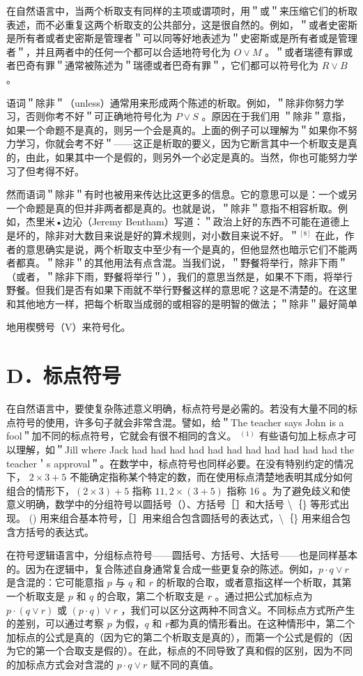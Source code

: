 在自然语言中，当两个析取支有同样的主项或谓项时，用＂或＂来压缩它们的析取表述，而不必重复这两个析取支的公共部分，这是很自然的。例如，＂或者史密斯是所有者或者史密斯是管理者＂可以同等好地表述为＂史密斯或是所有者或是管理者＂，并且两者中的任何一个都可以合适地符号化为 $O \vee M$ 。＂或者瑞德有罪或者巴奇有罪＂通常被陈述为＂瑞德或者巴奇有罪＂，它们都可以符号化为 $R \vee B$ 。

语词＂除非＂（unless）通常用来形成两个陈述的析取。例如，＂除非你努力学习，否则你考不好＂可正确地符号化为 $P \vee S$ 。原因在于我们用 ＂除非＂意指，如果一个命题不是真的，则另一个会是真的。上面的例子可以理解为＂如果你不努力学习，你就会考不好＂——这正是析取的要义，因为它断言其中一个析取支是真的，由此，如果其中一个是假的，则另外一个必定是真的。当然，你也可能努力学习了但考得不好。

然而语词＂除非＂有时也被用来传达比这更多的信息。它的意思可以是：一个或另一个命题是真的但并非两者都是真的。也就是说，＂除非＂意指不相容析取。例如，杰里米•边沁（Jeremy Bentham）写道：＂政治上好的东西不可能在道德上是坏的，除非对大数目来说是好的算术规则，对小数目来说不好。＂${ }^{[8]}$ 在此，作者的意思确实是说，两个析取支中至少有一个是真的，但他显然也暗示它们不能两者都真。＂除非＂的其他用法有点含混。当我们说，＂野餐将举行，除非下雨＂（或者，＂除非下雨，野餐将举行＂），我们的意思当然是，如果不下雨，将举行野餐。但我们是否有如果下雨就不举行野餐这样的意思呢？这是不清楚的。在这里和其他地方一样，把每个析取当成弱的或相容的是明智的做法；＂除非＂最好简单

地用楔劈号（V）来符号化。

\section*{D．标点符号}
在自然语言中，要使复杂陈述意义明确，标点符号是必需的。若没有大量不同的标点符号的使用，许多句子就会非常含混。譬如，给＂The teacher says John is a fool＂加不同的标点符号，它就会有很不相同的含义。 ${ }^{(1)}$ 有些语句加上标点才可以理解，如＂Jill where Jack had had had had had had had had had had had the teacher＇s approval＂。在数学中，标点符号也同样必要。在没有特别约定的情况下， $2 \times 3+5$ 不能确定指称某个特定的数，而在使用标点清楚地表明其成分如何组合的情形下，$(2 \times 3)+5$ 指称 $11,2 \times(3+5)$ 指称 16 。为了避免歧义和使意义明确，数学中的分组符号以圆括号（）、方括号［］和大括号 \textbackslash ｛\} 等形式出现。 () 用来组合基本符号，［］用来组合包含圆括号的表达式，\textbackslash ｛\} 用来组合包含方括号的表达式。

在符号逻辑语言中，分组标点符号——圆括号、方括号、大括号——也是同样基本的。因为在逻辑中，复合陈述自身通常复合成一些更复杂的陈述。例如，$p \cdot q \vee r$ 是含混的：它可能意指 $p$ 与 $q$ 和 $r$ 的析取的合取，或者意指这样一个析取，其第一个析取支是 $p$ 和 $q$ 的合取，第二个析取支是 $r$ 。通过把公式加标点为 $p \cdot(q \vee r)$ 或 $(p \cdot q) \vee r$ ，我们可以区分这两种不同含义。不同标点方式所产生的差别，可以通过考察 $p$ 为假，$q$ 和 $r$都为真的情形看出。在这种情形中，第二个加标点的公式是真的（因为它的第二个析取支是真的），而第一个公式是假的（因为它的第一个合取支是假的）。在此，标点的不同导致了真和假的区别，因为不同的加标点方式会对含混的 $p \cdot q \vee r$ 赋不同的真值。

